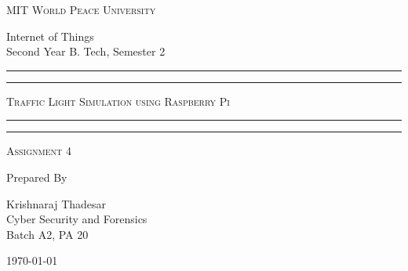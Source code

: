 \documentclass[11pt]{article}
\begin{document}
\begin{titlepage}
	\centering


	\huge\textsc{
		MIT World Peace University
	}\\

	\vspace{0.75\baselineskip} %

	\LARGE{
		Internet of Things\\
		Second Year B. Tech, Semester 2
	}

	\vfill %


	\rule{\textwidth}{1.6pt}\vspace*{-\baselineskip}\vspace*{2pt}
	\rule{\textwidth}{0.6pt}
	\vspace{0.75\baselineskip} %



	\huge{\textsc{
			Traffic Light Simulation using Raspberry Pi
		}} \\



	\vspace{0.5\baselineskip} %
	\rule{\textwidth}{0.6pt}\vspace*{-\baselineskip}\vspace*{2.8pt}
	\rule{\textwidth}{1.6pt}

	\vspace{1\baselineskip} %


	\LARGE\textsc{
		Assignment 4
	} %
	\vfill


	Prepared By
	\vspace{0.5\baselineskip} %

	\Large{
		Krishnaraj Thadesar \\
		Cyber Security and Forensics\\
		Batch A2, PA 20
	}


	\vspace{0.5\baselineskip} %
	\today

\end{titlepage}
\end{document}
